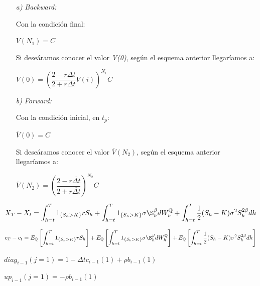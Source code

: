 \documentclass[titlepage]{article}
\begin{document}
\begin{itemize}
	\begin{itemize}
			\item[\textit{a)}] \textit{Backward:}
			
			\vspace{5pt}
			Con la condición final:
				\begin{center}
					$V(N_{1}) = C$
				\end{center}
			Si deseáramos conocer el valor \textit{V(0)}, según el esquema anterior llegaríamos a:
				\begin{center}
					$V(0) = \left(\dfrac{2 - r \Delta t}{2 + r \Delta t} V(i)\right)^{N_{1}} C$
				\end{center}
			
			\item[\textit{b)}] \textit{Forward:}
			
			\vspace{5pt}
			Con la condición inicial, en $t_{p}$:
				\begin{center}
					$\overline{V}(0) = C$
				\end{center}
			Si deseáramos conocer el valor $\overline{V}(N_{2})$, según el esquema anterior llegaríamos a:
				\begin{center}
					$\overline{V}(N_{2}) = \left(\dfrac{2 - r \overline{\Delta t}}{2 + r \overline{\Delta t}}\right)^{N_{2}} C$
				\end{center}
	\end{itemize}		
\end{itemize}



\begin{center}
	$X_{T} - X_{t} = \displaystyle \int_{h = t}^{T} 1_{\left\lbrace S_{h} > K\right\rbrace} r S_{h} + \int_{h = t}^{T} 1_{\left\lbrace S_{h} > K\right\rbrace} \sigma \S_{h}^{\beta} dW_{h}^{\mathbb{Q}} + \int_{h = t}^{T} \dfrac{1}{2}(S_{h} - K)\sigma^{2} S_{h}^{2\beta}dh$
\end{center}

$c_{T} - c_{t} = \displaystyle E_{\mathbb{Q}} \left[\int_{h = t}^{T} 1_{\left\lbrace S_{h} > K\right\rbrace} r S_{h}\right] + E_{\mathbb{Q}} \left[\int_{h = t}^{T} 1_{\left\lbrace S_{h} > K\right\rbrace} \sigma \S_{h}^{\beta} dW_{h}^{\mathbb{Q}}\right] + E_{\mathbb{Q}} \left[ \int_{h = t}^{T} \dfrac{1}{2}(S_{h} - K)\sigma^{2} S_{h}^{2\beta}dh \right]$

\vspace{10pt}
$diag_{i-1}(j = 1) = 1 - \Delta t c_{i-1}(1) + \rho b_{i-1}(1)$ 

\vspace{10pt}
$up_{i-1}(j = 1) = -\rho b_{i-1}(1)$
\end{document}
